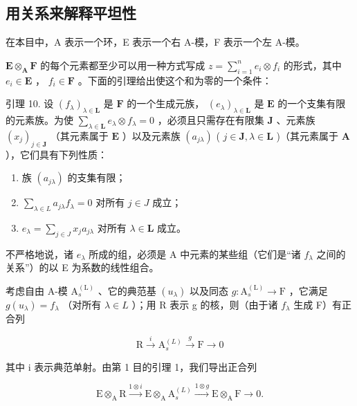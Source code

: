 \subsection{用关系来解释平坦性}

在本目中，A 表示一个环，E 表示一个右 A-模，F 表示一个左 A-模。

\(\mathbf{E} \otimes_{\mathbf{A}} \mathbf{F}\) 的每个元素都至少可以用一种方式写成 \(z = \sum_{i=1}^{n} e_i \otimes f_i\) 的形式，其中 \(e_i \in \mathbf{E}\) ， \(f_i \in \mathbf{F}\) 。下面的引理给出使这个和为零的一个条件：

引理 10. 设 \((f_{\lambda})_{\lambda \in \mathbf{L}}\) 是 \(\mathbf{F}\) 的一个生成元族， \((e_{\lambda})_{\lambda \in \mathbf{L}}\) 是 \(\mathbf{E}\) 的一个支集有限的元素族。为使 \(\sum_{\lambda \in \mathbf{L}} e_{\lambda} \otimes f_{\lambda} = 0\) ，必须且只需存在有限集 \(\mathbf{J}\) 、元素族 \((x_{j})_{j \in \mathbf{J}}\) （其元素属于 \(\mathbf{E}\) ）以及元素族 \((a_{j\lambda})\) ( \(j \in \mathbf{J}, \lambda \in \mathbf{L}\) )（其元素属于 \(\mathbf{A}\) ），它们具有下列性质：

\begin{enumerate}
\def\labelenumi{(\arabic{enumi})}
\item
  族 \((a_{j\lambda})\) 的支集有限；
\item
  \(\sum_{\lambda \in L} a_{j\lambda} f_{\lambda} = 0\) 对所有 \(j \in J\) 成立；
\item
  \(e_{\lambda} = \sum_{j\in J}x_ja_{j\lambda}\) 对所有 \(\lambda \in \mathbf{L}\) 成立。
\end{enumerate}

不严格地说，诸 \(e_{\lambda}\) 所成的组，必须是 A 中元素的某些组（它们是“诸 \(f_{\lambda}\) 之间的关系”）的以 E 为系数的线性组合。

考虑自由 A-模 \(\mathrm{A}_{s}^{(\mathrm{L})}\) 、它的典范基 \((u_{\lambda})\) 以及同态 \(g: \mathrm{A}_{s}^{(\mathrm{L})} \to \mathrm{F}\) ，它满足 \(g(u_{\lambda}) = f_{\lambda}\) （对所有 \(\lambda \in L\) ）；用 R 表示 g 的核，则（由于诸 \(f_{\lambda}\) 生成 F）有正合列

\[
\mathrm{R} \xrightarrow {i} \mathrm{A} _ {s} ^ {(L)} \xrightarrow {g} \mathrm{F} \longrightarrow 0
\]

其中 i 表示典范单射。由第 1 目的引理 1，我们导出正合列

\[
\mathrm{E} \otimes_ {\mathrm{A}} \mathrm{R} \xrightarrow {1 \otimes i} \mathrm{E} \otimes_ {\mathrm{A}} \mathrm{A} _ {s} ^ {(L)} \xrightarrow {1 \otimes g} \mathrm{E} \otimes_ {\mathrm{A}} \mathrm{F} \longrightarrow 0.\tag{13}
\]

